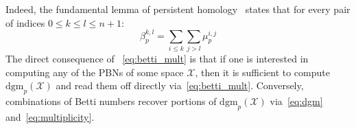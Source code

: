 Indeed, the fundamental lemma of persistent homology~\cite{edelsbrunner2022computational} states that for every pair of indices $0 \leq k \leq l \leq n+1$: 
\begin{equation}\label{eq:betti_mult}
	\beta_p^{k,l} = \sum\limits_{i \leq k} \sum\limits_{j > l} \mu_p^{i,j}
\end{equation}
The direct consequence of ~\eqref{eq:betti_mult} is that if one is interested in computing any of the PBNs of some space $\mathcal{X}$, then it is sufficient to compute $\mathrm{dgm}_p(\mathcal{X})$ and read them off directly via~\eqref{eq:betti_mult}. Conversely, combinations of Betti numbers recover portions of $\mathrm{dgm}_p(\mathcal{X})$  via~\eqref{eq:dgm} and~\eqref{eq:multiplicity}.



